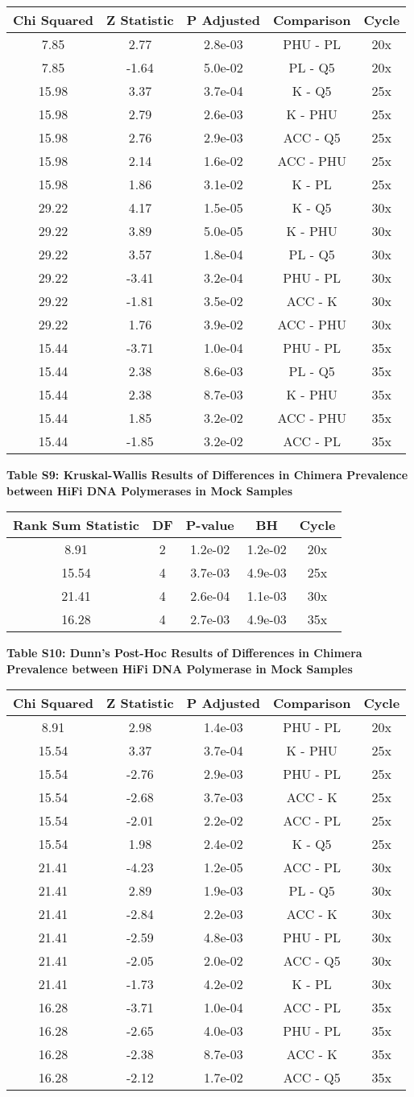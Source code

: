\documentclass[12pt,]{article}
\begin{document}
\begin{longtable}[]{@{}ccccc@{}}
\toprule
Chi Squared & Z Statistic & P Adjusted & Comparison &
Cycle\tabularnewline
\midrule
\endhead
7.85 & 2.77 & 2.8e-03 & PHU - PL & 20x\tabularnewline
7.85 & -1.64 & 5.0e-02 & PL - Q5 & 20x\tabularnewline
15.98 & 3.37 & 3.7e-04 & K - Q5 & 25x\tabularnewline
15.98 & 2.79 & 2.6e-03 & K - PHU & 25x\tabularnewline
15.98 & 2.76 & 2.9e-03 & ACC - Q5 & 25x\tabularnewline
15.98 & 2.14 & 1.6e-02 & ACC - PHU & 25x\tabularnewline
15.98 & 1.86 & 3.1e-02 & K - PL & 25x\tabularnewline
29.22 & 4.17 & 1.5e-05 & K - Q5 & 30x\tabularnewline
29.22 & 3.89 & 5.0e-05 & K - PHU & 30x\tabularnewline
29.22 & 3.57 & 1.8e-04 & PL - Q5 & 30x\tabularnewline
29.22 & -3.41 & 3.2e-04 & PHU - PL & 30x\tabularnewline
29.22 & -1.81 & 3.5e-02 & ACC - K & 30x\tabularnewline
29.22 & 1.76 & 3.9e-02 & ACC - PHU & 30x\tabularnewline
15.44 & -3.71 & 1.0e-04 & PHU - PL & 35x\tabularnewline
15.44 & 2.38 & 8.6e-03 & PL - Q5 & 35x\tabularnewline
15.44 & 2.38 & 8.7e-03 & K - PHU & 35x\tabularnewline
15.44 & 1.85 & 3.2e-02 & ACC - PHU & 35x\tabularnewline
15.44 & -1.85 & 3.2e-02 & ACC - PL & 35x\tabularnewline
\bottomrule
\end{longtable}

\newpage

\textbf{Table S9: Kruskal-Wallis Results of Differences in Chimera
Prevalence between HiFi DNA Polymerases in Mock Samples}

\begin{longtable}[]{@{}ccccc@{}}
\toprule
Rank Sum Statistic & DF & P-value & BH & Cycle\tabularnewline
\midrule
\endhead
8.91 & 2 & 1.2e-02 & 1.2e-02 & 20x\tabularnewline
15.54 & 4 & 3.7e-03 & 4.9e-03 & 25x\tabularnewline
21.41 & 4 & 2.6e-04 & 1.1e-03 & 30x\tabularnewline
16.28 & 4 & 2.7e-03 & 4.9e-03 & 35x\tabularnewline
\bottomrule
\end{longtable}

\newpage

\textbf{Table S10: Dunn's Post-Hoc Results of Differences in Chimera
Prevalence between HiFi DNA Polymerase in Mock Samples}

\begin{longtable}[]{@{}ccccc@{}}
\toprule
Chi Squared & Z Statistic & P Adjusted & Comparison &
Cycle\tabularnewline
\midrule
\endhead
8.91 & 2.98 & 1.4e-03 & PHU - PL & 20x\tabularnewline
15.54 & 3.37 & 3.7e-04 & K - PHU & 25x\tabularnewline
15.54 & -2.76 & 2.9e-03 & PHU - PL & 25x\tabularnewline
15.54 & -2.68 & 3.7e-03 & ACC - K & 25x\tabularnewline
15.54 & -2.01 & 2.2e-02 & ACC - PL & 25x\tabularnewline
15.54 & 1.98 & 2.4e-02 & K - Q5 & 25x\tabularnewline
21.41 & -4.23 & 1.2e-05 & ACC - PL & 30x\tabularnewline
21.41 & 2.89 & 1.9e-03 & PL - Q5 & 30x\tabularnewline
21.41 & -2.84 & 2.2e-03 & ACC - K & 30x\tabularnewline
21.41 & -2.59 & 4.8e-03 & PHU - PL & 30x\tabularnewline
21.41 & -2.05 & 2.0e-02 & ACC - Q5 & 30x\tabularnewline
21.41 & -1.73 & 4.2e-02 & K - PL & 30x\tabularnewline
16.28 & -3.71 & 1.0e-04 & ACC - PL & 35x\tabularnewline
16.28 & -2.65 & 4.0e-03 & PHU - PL & 35x\tabularnewline
16.28 & -2.38 & 8.7e-03 & ACC - K & 35x\tabularnewline
16.28 & -2.12 & 1.7e-02 & ACC - Q5 & 35x\tabularnewline
\bottomrule
\end{longtable}
\end{document}
